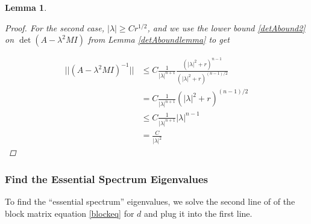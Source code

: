 \documentclass[12pt]{article}
\newtheorem{lemma}{Lemma}
\begin{document}
\begin{lemma}
\begin{proof}
For the second case, $|\lambda| \geq C r^{1/2}$, and we use the lower bound \eqref{detAbound2} on $\det(A - \lambda^2 M I)$ from Lemma \ref{detAboundlemma} to get

\begin{align*}
||(A - \lambda^2 M I)^{-1}|| &\leq C \frac{1}{|\lambda|^{n+1}} 
\frac{\left( |\lambda|^2 + r \right)^{n-1}}{\left( |\lambda|^2 + r \right)^{(n-1)/2}} \\
&= C \frac{1}{|\lambda|^{n+1}} \left( |\lambda|^2 + r \right)^{(n-1)/2} \\
&\leq C \frac{1}{|\lambda|^{n+1}} |\lambda|^{n-1} \\
&=\frac{C}{|\lambda|^2}
\end{align*}

\end{proof}
\end{lemma}

\subsubsection{Find the Essential Spectrum Eigenvalues}

To find the ``essential spectrum'' eigenvalues, we solve the second line of of the block matrix equation \eqref{blockeq} for $d$ and plug it into the first line.

\end{document}
